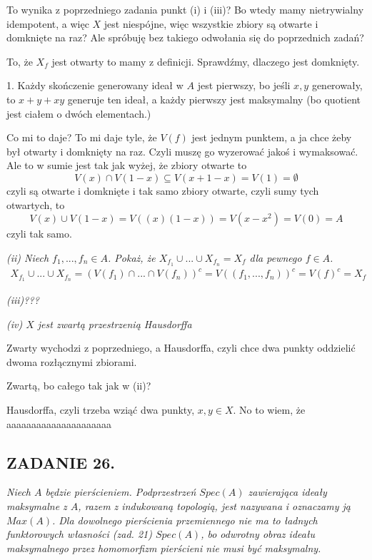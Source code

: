 \documentclass{article}
\begin{document}
To wynika z poprzedniego zadania punkt (i) i (iii)? Bo wtedy mamy nietrywialny idempotent, a więc $X$ jest niespójne, więc wszystkie zbiory są otwarte i domknięte na raz? Ale spróbuję bez takiego odwołania się do poprzednich zadań?

To, że $X_f$ jest otwarty to mamy z definicji. Sprawdźmy, dlaczego jest domknięty.

1. Każdy skończenie generowany ideał w $A$ jest pierwszy, bo jeśli $x,y$ generowały, to $x+y+xy$ generuje ten ideał, a każdy pierwszy jest maksymalny (bo quotient jest ciałem o dwóch elementach.)

Co mi to daje? To mi daje tyle, że $V(f)$ jest jednym punktem, a ja chce żeby był otwarty i domknięty na raz. Czyli muszę go wyzerować jakoś i wymaksować. Ale to w sumie jest tak jak wyżej, że zbiory otwarte to
$$V(x)\cap V(1-x)\subseteq V(x+1-x)=V(1)=\emptyset$$
czyli są otwarte i domknięte i tak samo zbiory otwarte, czyli sumy tych otwartych, to
$$V(x)\cup V(1-x)=V((x)(1-x))=V(x-x^2)=V(0)=A$$
czyli tak samo.



\emph{\color{pink}(ii) Niech $f_1,...,f_n\in A$. Pokaż, że $X_{f_1}\cup...\cup X_{f_n}=X_f$ dla pewnego $f\in A$.}
\begin{align*}
    X_{f_1}\cup...\cup X_{f_n}=(V(f_1)\cap...\cap V(f_n))^c=V((f_1,...,f_n))^c=V(f)^c=X_f
\end{align*}

\emph{\color{yellow}(iii)???}

\emph{\color{yellow}(iv) $X$ jest zwartą przestrzenią Hausdorffa}

Zwarty wychodzi z poprzedniego, a Hausdorffa, czyli chce dwa punkty oddzielić dwoma rozłącznymi zbiorami. 

Zwartą, bo całego tak jak w (ii)?

Hausdorffa, czyli trzeba wziąć dwa punkty, $x,y\in X$. No to wiem, że aaaaaaaaaaaaaaaaaaaaa

\subsection*{ZADANIE 26.}
\emph{\color{pink}Niech $A$ będzie pierścieniem. Podprzestrzeń $Spec(A)$ zawierająca ideały maksymalne z $A$, razem z indukowaną topologią, jest nazywana}\emph{\color{pink} i oznaczamy ją $Max(A)$. Dla dowolnego pierścienia przemiennego nie ma to ładnych funktorowych własności (zad. 21) $Spec(A)$, bo odwrotny obraz ideału maksymalnego przez homomorfizm pierścieni nie musi być maksymalny.}
\end{document}
